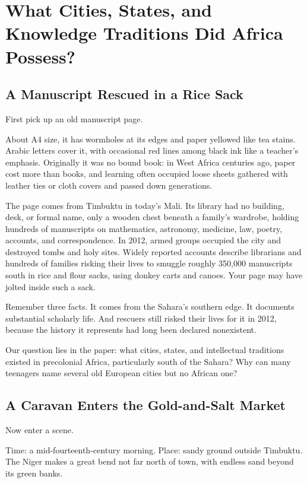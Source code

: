 \chapter[African Cities, States, and Knowledge]{What Cities, States, and Knowledge Traditions Did Africa Possess?}
\section{A Manuscript Rescued in a Rice Sack}
First pick up an old manuscript page.

About A4 size, it has wormholes at its edges and paper yellowed like tea stains. Arabic letters cover it, with occasional red lines among black ink like a teacher's emphasis. Originally it was no bound book: in West Africa centuries ago, paper cost more than books, and learning often occupied loose sheets gathered with leather ties or cloth covers and passed down generations.

The page comes from Timbuktu in today's Mali. Its library had no building, desk, or formal name, only a wooden chest beneath a family's wardrobe, holding hundreds of manuscripts on mathematics, astronomy, medicine, law, poetry, accounts, and correspondence. In 2012, armed groups occupied the city and destroyed tombs and holy sites. Widely reported accounts describe librarians and hundreds of families risking their lives to smuggle roughly 350,000 manuscripts south in rice and flour sacks, using donkey carts and canoes. Your page may have jolted inside such a sack.

Remember three facts. It comes from the Sahara's southern edge. It documents substantial scholarly life. And rescuers still risked their lives for it in 2012, because the history it represents had long been declared nonexistent.

Our question lies in the paper: what cities, states, and intellectual traditions existed in precolonial Africa, particularly south of the Sahara? Why can many teenagers name several old European cities but no African one?

\section{A Caravan Enters the Gold-and-Salt Market}
Now enter a scene.

Time: a mid-fourteenth-century morning. Place: sandy ground outside Timbuktu. The Niger makes a great bend not far north of town, with endless sand beyond its green banks.

